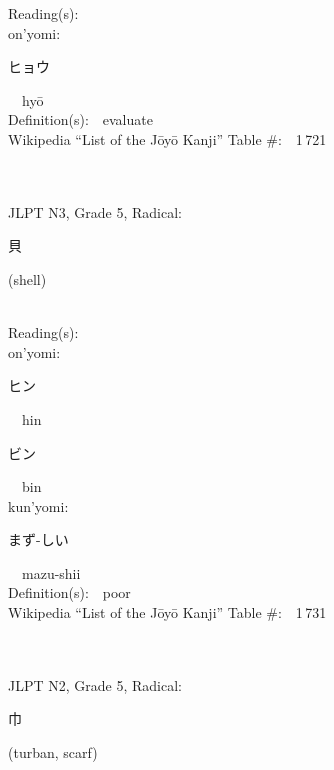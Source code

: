 \begin{multicols}{2}
Reading(s):\ \ \\
{\hspace*{1em}}on'yomi:\ \ \\
{\hspace*{2em}}{\begin{CJK}{UTF8}{min} ヒョウ \end{CJK}}\ \ hy\=o\ \ \\
Definition(s):\ \ evaluate \\
Wikipedia ``List of the J\=oy\=o Kanji'' Table \#:\ \ 1\,721 \\
\ \ \\
{\fontsize{34pt}{40pt}  }\ \ \\  %
{JLPT N3, Grade 5, Radical:\ \ {\begin{CJK}{UTF8}{min} 貝 \end{CJK}} (shell) } \\
Reading(s):\ \ \\
{\hspace*{1em}}on'yomi:\ \ \\
{\hspace*{2em}}{\begin{CJK}{UTF8}{min} ヒン \end{CJK}}\ \ hin\ \ \\
{\hspace*{2em}}{\begin{CJK}{UTF8}{min} ビン \end{CJK}}\ \ bin\ \ \\
{\hspace*{1em}}kun'yomi:\ \ \\
{\hspace*{2em}}{\begin{CJK}{UTF8}{min} まず-しい \end{CJK}}\ \ mazu-shii\ \ \\
Definition(s):\ \ poor \\
Wikipedia ``List of the J\=oy\=o Kanji'' Table \#:\ \ 1\,731 \\
\ \ \\
{\fontsize{34pt}{40pt}  }\ \ \\  %
{JLPT N2, Grade 5, Radical:\ \ {\begin{CJK}{UTF8}{min} 巾 \end{CJK}} (turban, scarf) } \\

\end{multicols}
